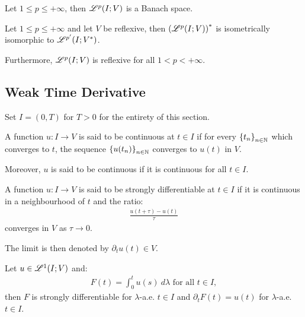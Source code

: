 \begin{theorem}
    Let $1 \leq p \leq +\infty$, then $\mathscr{L}^{p}(I; V)$ is a Banach space.
\end{theorem}

\begin{theorem} %
    Let $1 \leq p \leq +\infty$ and let $V$ be reflexive, then $\left( \mathscr{L}^{p}(I; V) \right)^*$ is isometrically isomorphic to $\mathscr{L}^{p^{\prime}}(I; V^*)$.

    Furthermore, $\mathscr{L}^{p}(I; V)$ is reflexive for all $1 < p < +\infty$.
\end{theorem}

\newpage
\subsection{Weak Time Derivative}

Set $I = (0, T)$ for $T > 0$ for the entirety of this section.

\begin{definition}[Continuity]
    A function $u\colon I \rightarrow V$ is said to be continuous at $t \in I$ if for every $\left\{ t_n \right\}_{n \in \mathbb{N}}$ which converges to $t$, the sequence $\left\{ u(t_n) \right\}_{n \in \mathbb{N}}$ converges to $u(t)$ in $V$.

    Moreover, $u$ is said to be continuous if it is continuous for all $t \in I$.
\end{definition}

\begin{definition}
    A function $u\colon I \rightarrow V$ is said to be strongly differentiable at $t \in I$ if it is continuous in a neighbourhood of $t$ and the ratio:
    \begin{gather}
        \frac{u(t + \tau) - u(t)}{\tau}
    \end{gather}
    converges in $V$ as $\tau \rightarrow 0$.

    The limit is then denoted by $\partial_t u(t) \in V$.
\end{definition}

\begin{theorem}
    Let $u \in \mathscr{L}^{1}(I; V)$ and:
    \begin{gather}
        F(t) = \int_0^t u(s) ~ d \lambda \text{ for all } t \in I,
    \end{gather}
    then $F$ is strongly differentiable for $\lambda$-a.e. $t \in I$ and $\partial_t F(t) = u(t)$ for $\lambda$-a.e. $t \in I$.
\end{theorem}

